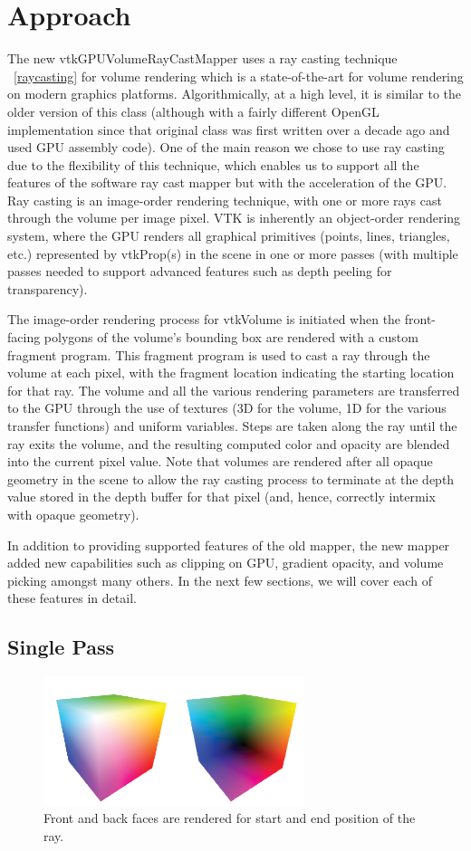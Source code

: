 \section{Approach} The new vtkGPUVolumeRayCastMapper uses a ray casting
technique ~\ref{raycasting} for volume rendering which is a state-of-the-art for
volume rendering on modern graphics platforms. Algorithmically, at a high level,
it is similar to the older version of this class (although with a fairly
different OpenGL implementation since that original class was first written over
a decade ago and used GPU assembly code).  One of the main reason we chose to
use ray casting due to the flexibility of this technique, which enables us to
support all the features of the software ray cast mapper but with the
acceleration of the GPU. Ray casting is an image-order rendering technique, with
one or more rays cast through the volume per image pixel. VTK is inherently an
object-order rendering system, where the GPU renders all graphical primitives
(points, lines, triangles, etc.) represented by vtkProp(s) in the scene in one
or more passes (with multiple passes needed to support advanced features such as
depth peeling for transparency).

The image-order rendering process for vtkVolume is initiated when the
front-facing polygons of the volume’s bounding box are rendered with a custom
fragment program. This fragment program is used to cast a ray through the volume
at each pixel, with the fragment location indicating the starting location for
that ray. The volume and all the various rendering parameters are transferred to
the GPU through the use of textures (3D for the volume, 1D for the various
transfer functions) and uniform variables. Steps are taken along the ray until
the ray exits the volume, and the resulting computed color and opacity are
blended into the current pixel value. Note that volumes are rendered after all
opaque geometry in the scene to allow the ray casting process to terminate at
the depth value stored in the depth buffer for that pixel (and, hence, correctly
intermix with opaque geometry).

In addition to providing supported features of the old mapper, the new mapper
added new capabilities such as clipping on GPU,  gradient opacity, and volume
picking amongst many others. In the next few sections, we will cover each of
these features in detail.

\subsection{Single Pass}
\begin{figure}
\centering
\includegraphics[width=3in]{frontandback.png}
\caption{Front and back faces are rendered for start and end position of the ray.}
\label{fig:raycasting}
\end{figure}


